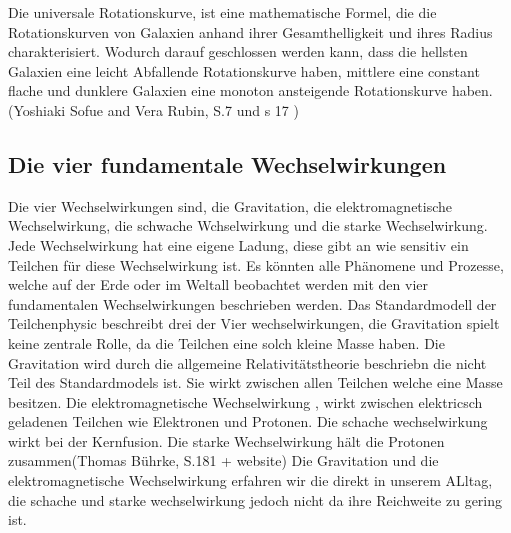 Die universale Rotationskurve, ist eine mathematische Formel, die die Rotationskurven von Galaxien anhand ihrer Gesamthelligkeit und ihres Radius charakterisiert.
Wodurch darauf geschlossen werden kann, dass die hellsten Galaxien eine leicht Abfallende Rotationskurve haben, mittlere eine constant flache und dunklere 
Galaxien eine monoton ansteigende Rotationskurve haben. (Yoshiaki Sofue and Vera Rubin, S.7 und s 17 )
\subsection{Die vier fundamentale Wechselwirkungen}
Die vier Wechselwirkungen sind, die Gravitation, die elektromagnetische Wechselwirkung, die schwache Wchselwirkung und die 
starke Wechselwirkung. Jede Wechselwirkung hat eine eigene Ladung, diese gibt an wie sensitiv ein Teilchen für diese Wechselwirkung ist. 
Es könnten alle Phänomene und Prozesse, welche auf der Erde oder im Weltall beobachtet werden mit den vier fundamentalen Wechselwirkungen beschrieben werden.
Das Standardmodell der Teilchenphysic beschreibt drei der Vier wechselwirkungen, die Gravitation spielt keine zentrale Rolle, da die Teilchen eine solch kleine Masse haben.
Die Gravitation wird durch die allgemeine Relativitätstheorie beschriebn die nicht Teil des Standardmodels ist. Sie wirkt zwischen allen Teilchen welche eine Masse besitzen. Die elektromagnetische
Wechselwirkung , wirkt zwischen elektricsch geladenen Teilchen wie Elektronen und Protonen. Die schache wechselwirkung wirkt bei der Kernfusion. Die starke Wechselwirkung hält die Protonen zusammen(Thomas Bührke, S.181 + website)
Die Gravitation und die elektromagnetische Wechselwirkung erfahren wir die direkt in unserem ALltag, die schache und starke wechselwirkung jedoch nicht da ihre Reichweite zu gering ist.
